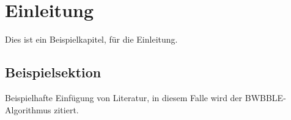 \chapter{Einleitung}
\label{chapter:einleitung}
Dies ist ein Beispielkapitel, für die Einleitung. 
\section{Beispielsektion}
Beispielhafte Einfügung von Literatur, in diesem Falle wird der BWBBLE-Algorithmus \cite{Huang2013} zitiert.